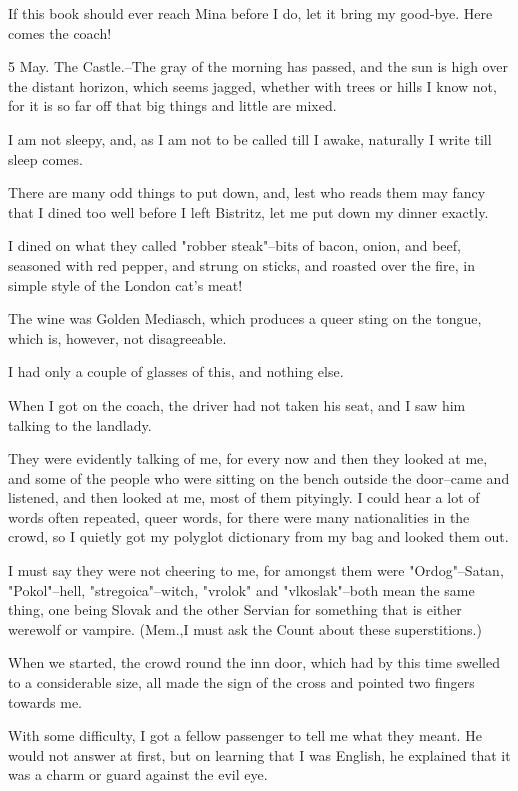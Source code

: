If this book should ever reach Mina before I do, let it bring my good-bye. Here comes the coach! 

5 May. The Castle.--The gray of the morning has passed, and the sun is high over the distant horizon, which seems jagged, whether with trees or hills I know not, for it is so far off that big things and little are mixed. 

I am not sleepy, and, as I am not to be called till I awake, naturally I write till sleep comes. 

There are many odd things to put down, and, lest who reads them may fancy that I dined too well before I left Bistritz, let me put down my dinner exactly. 

I dined on what they called "robber steak"--bits of bacon, onion, and beef, seasoned with red pepper, and strung on sticks, and roasted over the fire, in simple style of the London cat's meat! 

The wine was Golden Mediasch, which produces a queer sting on the tongue, which is, however, not disagreeable. 

I had only a couple of glasses of this, and nothing else. 

When I got on the coach, the driver had not taken his seat, and I saw him talking to the landlady. 

They were evidently talking of me, for every now and then they looked at me, and some of the people who were sitting on the bench outside the door--came and listened, and then looked at me, most of them pityingly. I could hear a lot of words often repeated, queer words, for there were many nationalities in the crowd, so I quietly got my polyglot dictionary from my bag and looked them out. 

I must say they were not cheering to me, for amongst them were "Ordog"--Satan, "Pokol"--hell, "stregoica"--witch, "vrolok" and "vlkoslak"--both mean the same thing, one being Slovak and the other Servian for something that is either werewolf or vampire. (Mem.,I must ask the Count about these superstitions.) 

When we started, the crowd round the inn door, which had by this time swelled to a considerable size, all made the sign of the cross and pointed two fingers towards me. 

With some difficulty, I got a fellow passenger to tell me what they meant. He would not answer at first, but on learning that I was English, he explained that it was a charm or guard against the evil eye. 

